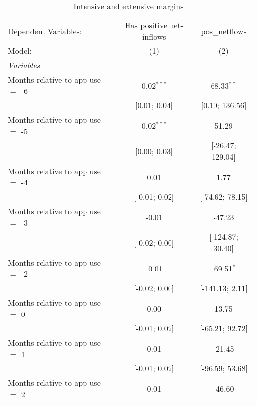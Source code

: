 
\begin{table}[htbp]
   \centering
   \tiny
   \begin{threeparttable}[b]
      \caption{\label{tab:dspend_intext} Intensive and extensive margins}
      \begin{tabular}{lcc}
         \tabularnewline \midrule \midrule
         Dependent Variables:              & Has positive net-inflows & pos\_netflows\\   
         Model:                            & (1)                      & (2)\\  
         \midrule
         \emph{Variables}\\
         Months relative to app use $=$ -6 & 0.02$^{***}$             & 68.33$^{**}$\\   
                                           & [0.01; 0.04]             & [0.10; 136.56]\\   
         Months relative to app use $=$ -5 & 0.02$^{***}$             & 51.29\\   
                                           & [0.00; 0.03]             & [-26.47; 129.04]\\   
         Months relative to app use $=$ -4 & 0.01                     & 1.77\\   
                                           & [-0.01; 0.02]            & [-74.62; 78.15]\\   
         Months relative to app use $=$ -3 & -0.01                    & -47.23\\   
                                           & [-0.02; 0.00]            & [-124.87; 30.40]\\   
         Months relative to app use $=$ -2 & -0.01                    & -69.51$^{*}$\\   
                                           & [-0.02; 0.00]            & [-141.13; 2.11]\\   
         Months relative to app use $=$ 0  & 0.00                     & 13.75\\   
                                           & [-0.01; 0.02]            & [-65.21; 92.72]\\   
         Months relative to app use $=$ 1  & 0.01                     & -21.45\\   
                                           & [-0.01; 0.02]            & [-96.59; 53.68]\\   
         Months relative to app use $=$ 2  & 0.01                     & -46.60\\   

\end{tabular}
\end{threeparttable}
\end{table}
